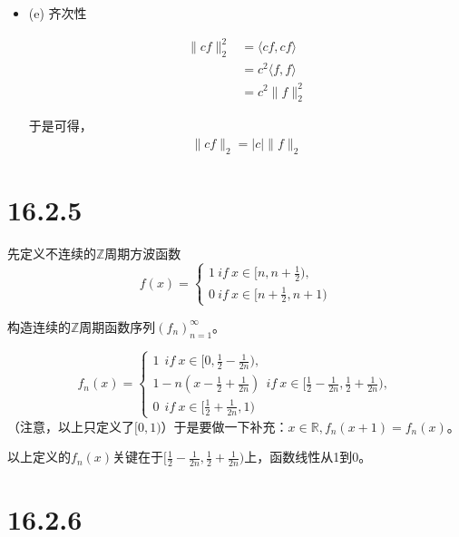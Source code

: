 \documentclass{article}
\begin{document}
\begin{itemize}
  \item (e) 齐次性

        \begin{align*}
          \|cf\|_2^2 & = \langle cf, cf \rangle  \\
                     & = c^2\langle f, f \rangle \\
                     & = c^2 \|f\|_2^2
        \end{align*}

        于是可得，
        \begin{align*}
          \|cf\|_2 = |c| \|f\|_2
        \end{align*}
\end{itemize}

\section*{16.2.5}

先定义不连续的$\mathbb{Z}$周期方波函数
\begin{equation*}
  f(x) =
  \begin{cases*}
    1 \ if \ x \in [n, n + \frac{1}{2}), \\
    0 \ if \ x \in [n + \frac{1}{2}, n + 1)
  \end{cases*}
\end{equation*}

构造连续的$\mathbb{Z}$周期函数序列$(f_n)_{n = 1}^\infty$。

\begin{equation*}
  f_n(x) =
  \begin{cases*}
    1 \ \ if \ x \in [0, \frac{1}{2} - \frac{1}{2n}),                                                              \\
    1 - n(x - \frac{1}{2} + \frac{1}{2n}) \ \ if \ x \in [\frac{1}{2} - \frac{1}{2n}, \frac{1}{2} + \frac{1}{2n}), \\
    0 \ \ if \ x \in [\frac{1}{2} + \frac{1}{2n}, 1)
  \end{cases*}
\end{equation*}
（注意，以上只定义了$[0, 1)$）于是要做一下补充：$x \in \mathbb{R}, f_n(x + 1) = f_n(x)$。

以上定义的$f_n(x)$关键在于$[\frac{1}{2} - \frac{1}{2n}, \frac{1}{2} + \frac{1}{2n})$上，函数线性从1到0。

\section*{16.2.6}
\end{document}
